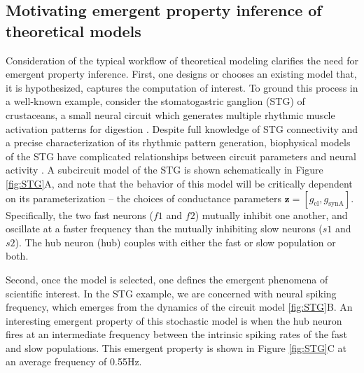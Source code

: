 \documentclass[11pt]{article}
\begin{document}
\subsection{Motivating emergent property inference of theoretical models} \label{results_motivating}

Consideration of the typical workflow of theoretical modeling clarifies the need for emergent property inference.  
First, one designs or chooses an existing model that, it is hypothesized, captures the computation of interest. 
To ground this process in a well-known example, consider the stomatogastric ganglion (STG) of crustaceans, a small neural circuit which generates multiple rhythmic muscle activation patterns for digestion \cite{marder2002cellular}.
Despite full knowledge of STG connectivity and a precise characterization of its rhythmic pattern generation, biophysical models of the STG have complicated relationships between circuit parameters and neural activity \cite{goldman2001global, prinz2004similar}.
A subcircuit model of the STG \cite{gutierrez2013multiple} is shown schematically in Figure \ref{fig:STG}A, and note that the behavior of this model will be critically dependent on its parameterization -- the choices of conductance parameters $\mathbf{z} = [g_{\text{el}}, g_{\text{synA}}]$.
Specifically, the two fast neurons ($f1$ and $f2$) mutually inhibit one another, and oscillate at a faster frequency than the mutually inhibiting slow neurons ($s1$ and $s2$).  
The hub neuron (hub) couples with either the fast or slow population or both.  

Second, once the model is selected, one defines the emergent phenomena of scientific interest.
In the STG example, we are concerned with neural spiking frequency, which emerges from the dynamics of the circuit model \ref{fig:STG}B.
An interesting emergent property of this stochastic model is when the hub neuron fires at an intermediate frequency between the intrinsic spiking rates of the fast and slow populations.
This emergent property is shown in Figure \ref{fig:STG}C at an average frequency of 0.55Hz.
\end{document}
